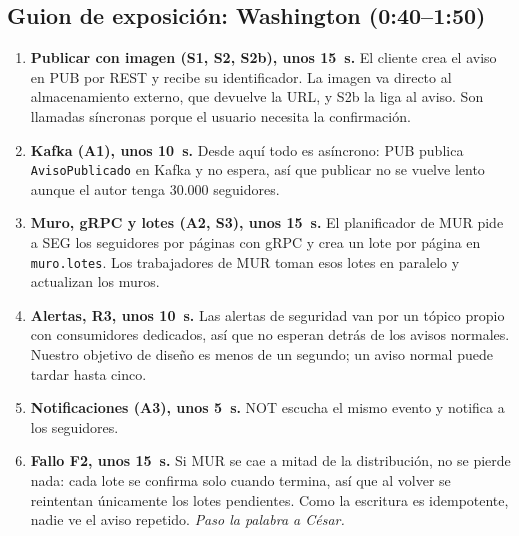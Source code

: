 
\subsection*{Guion de exposición: Washington (0:40--1:50)}

\begin{enumerate}[leftmargin=*]
  \item \textbf{Publicar con imagen (S1, S2, S2b), unos 15~s.} El cliente crea el aviso en
  PUB por REST y recibe su identificador. La imagen va directo al almacenamiento externo,
  que devuelve la URL, y S2b la liga al aviso. Son llamadas síncronas porque el usuario
  necesita la confirmación.
  \item \textbf{Kafka (A1), unos 10~s.} Desde aquí todo es asíncrono: PUB publica
  \texttt{AvisoPublicado} en Kafka y no espera, así que publicar no se vuelve lento aunque
  el autor tenga 30.000 seguidores.
  \item \textbf{Muro, gRPC y lotes (A2, S3), unos 15~s.} El planificador de MUR pide a SEG
  los seguidores por páginas con gRPC y crea un lote por página en \texttt{muro.lotes}.
  Los trabajadores de MUR toman esos lotes en paralelo y actualizan los muros.
  \item \textbf{Alertas, R3, unos 10~s.} Las alertas de seguridad van por un tópico propio
  con consumidores dedicados, así que no esperan detrás de los avisos normales. Nuestro
  objetivo de diseño es menos de un segundo; un aviso normal puede tardar hasta cinco.
  \item \textbf{Notificaciones (A3), unos 5~s.} NOT escucha el mismo evento y notifica a
  los seguidores.
  \item \textbf{Fallo F2, unos 15~s.} Si MUR se cae a mitad de la distribución, no se
  pierde nada: cada lote se confirma solo cuando termina, así que al volver se reintentan
  únicamente los lotes pendientes. Como la escritura es idempotente, nadie ve el aviso
  repetido. \emph{Paso la palabra a César.}
\end{enumerate}

